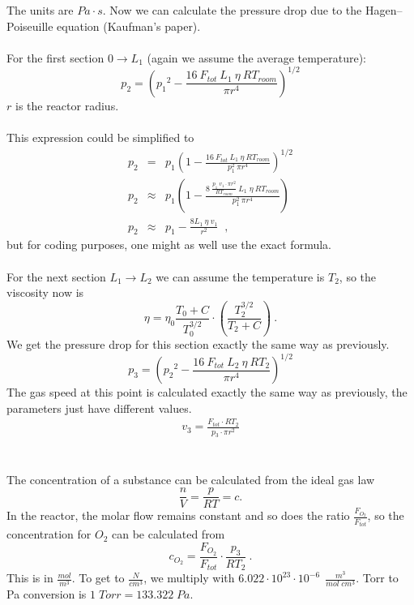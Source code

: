 \documentclass[10pt, a4paper]{article}
\begin{document}
The units are $Pa \cdot s$. Now we can calculate the pressure drop due to the Hagen–Poiseuille equation (Kaufman's paper). 
\\
\\
For the first section $0 \rightarrow L_1$ (again we assume the average temperature): 
\begin{equation*}
p_2 = \left( {p_1}^2 - \frac{16\:F_{tot} \: L_1 \: \eta \: RT_{room}}{\pi r^4} \right)^{1/2}
\end{equation*}
$r$ is the reactor radius. 
\\
\\
This expression could be simplified to 
\begin{eqnarray*}
p_2 &=& p_1\left(  1 - \frac{16\:F_{tot} \: L_1 \: \eta \: R T_{room} }{p_1^2 \: \pi r^4} \right)^{1/2} \\
p_2 &\approx & p_1 \left( 1 - \frac{8\:\frac{p_1\; v_1 \cdot \pi r^2}{R T_{room}  } \: L_1 \; \eta \: RT_{room}}{p_1^2 \: \pi r^4} \right) \\
p_2 &\approx & p_1 - \frac{8L_1 \: \eta \: v_1}{r^2} \;\;,
\end{eqnarray*}
but for coding purposes, one might as well use the exact formula. 
\\
\\
For the next section $L_1 \rightarrow L_2$ we can assume the temperature is $T_2$, so the viscosity now is 
\begin{equation*}
\eta = \eta_0 \frac{T_0 + C}{T_0^{3/2}} \cdot \left( \frac{T_{2}^{3/2}}{T_{2} + C} \right) \:.
\end{equation*}
We get the pressure drop for this section exactly the same way as previously. 
\begin{equation*}
p_3 = \left( {p_2}^2 - \frac{16\:F_{tot} \: L_2 \: \eta \: RT_2}{\pi r^4} \right)^{1/2}
\end{equation*}
The gas speed at this point is calculated exactly the same way as previously, the parameters just have different values. 
\begin{eqnarray*}
v_3 = \frac{F_{tot} \cdot RT_2}{p_3 \cdot \pi r^2}
\end{eqnarray*}
\\
\\
The concentration of a substance can be calculated from the ideal gas law 
\begin{equation*}
\frac{n}{V} = \frac{p}{RT} = c. 
\end{equation*}
In the reactor, the molar flow remains constant and so does the ratio $ \frac{F_{O_2}}{F_{tot}}$, so the concentration for $O_2$ can be calculated from 
\begin{equation*}
c_{O_2} = \frac{F_{O_2}}{F_{tot}} \cdot \frac{p_3}{RT_2} \:. 
\end{equation*}
This is in $ \frac{mol}{m^3}$. To get to $ \frac{N}{cm^3}$, we multiply with $6.022 \cdot 10^{23} \cdot 10^{-6}\:\: \frac{m^3}{mol\;cm^3} $. 
Torr to Pa conversion is $1\;Torr = 133.322\;Pa$. 
\end{document}
